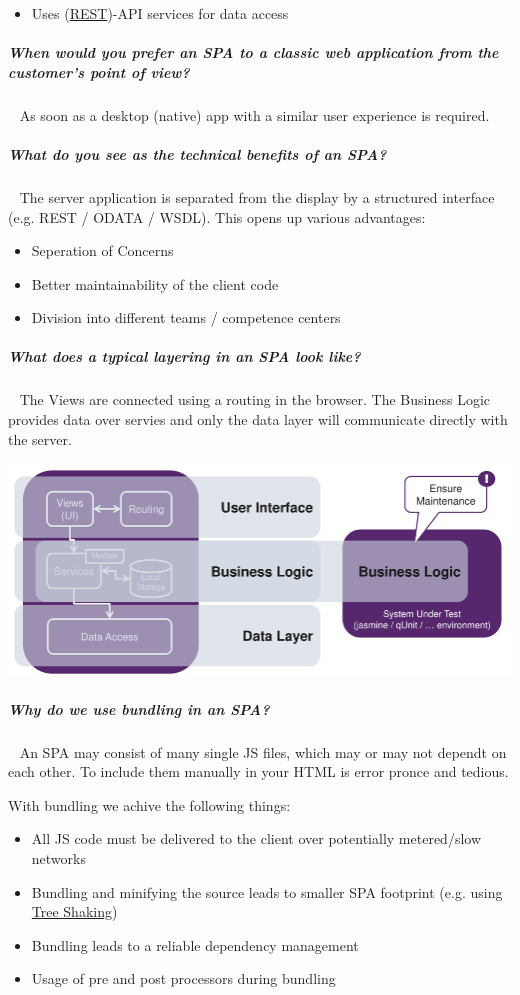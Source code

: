 \documentclass[11pt,twoside,landscape]{article}
\begin{document}
\begin{multicols}{4}
\begin{itemize}
\item Uses (\href{../../../roam/20230108172748-what_is_rest.org}{REST})-API services for data access
\end{itemize}
\subparagraph{When would you prefer an SPA to a classic web application from the customer's point of view?} \
\label{sec:org6e4d008}
As soon as a desktop (native) app with a similar user experience is required.
\subparagraph{What do you see as the technical benefits of an SPA?} \
\label{sec:org1202cb4}
The server application is separated from the display by a structured interface (e.g. REST / ODATA / WSDL). This opens up various advantages:
\begin{itemize}
\item Seperation of Concerns
\item Better maintainability of the client code
\item Division into different teams / competence centers
\end{itemize}
\subparagraph{What does a typical layering in an SPA look like?} \
\label{sec:org6f19eb9}
The Views are connected using a routing in the browser.
The Business Logic provides data over servies and only the data layer will communicate directly with the server.

{
\begin{center}
\includegraphics[width=.9\linewidth]{img/spa_layering.png}
\end{center}
\label{fig:layering-in-spa}
}
\subparagraph{Why do we use bundling in an SPA?} \
\label{sec:orgd1f59c4}
An SPA may consist of many single JS files, which may or may not dependt on each other.
To include them manually in your HTML is error pronce and tedious.

With bundling we achive the following things:
\begin{itemize}
\item All JS code must be delivered to the client over potentially metered/slow networks
\item Bundling and minifying the source leads to smaller SPA footprint (e.g. using \href{../../../roam/20231228113108-what_is_tree_shaking.org}{Tree Shaking})
\item Bundling leads to a reliable dependency management
\item Usage of pre and post processors during bundling
\end{itemize}



\end{multicols}
\end{document}
